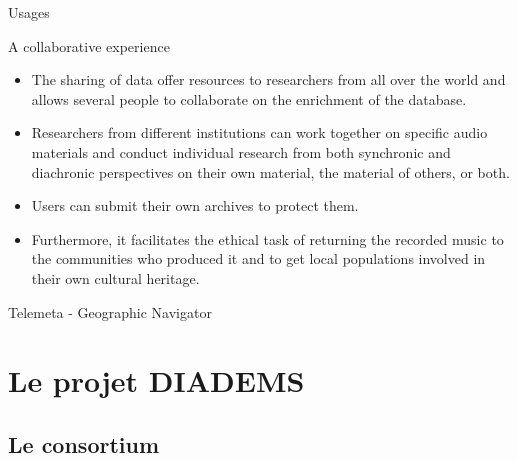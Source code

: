 \documentclass[final, hyperref, table]{beamer}
\begin{document}
     
    \begin{frame}{Usages}
    \begin{block}{A collaborative experience}
        \begin{itemize}
    \item The sharing of data offer resources to researchers from all over the world and allows several people to \alert{collaborate on the enrichment of the database}.
     \item Researchers from different institutions can work together on
      specific audio materials and conduct individual research from
      both synchronic and diachronic perspectives on their own
      material, the material of others, or both.
    \item Users can submit their own archives to protect them.

    \item Furthermore, it facilitates the ethical task of \alert{returning
      the recorded music to the communities who produced it} and to get local populations involved in their own cultural heritage.   
        \end{itemize}
    \end{block}

    \end{frame}

    \begin{frame}[plain, label=geonavigator]{Telemeta - Geographic Navigator}
    \begin{center}
    \end{center}
    \hyperlink{telemeta_features}{}
\end{frame}

    
\section[Le projet DIADEMS]{Le projet DIADEMS}\label{sec:Diadems}

\subsection{Le consortium}
\end{document}
